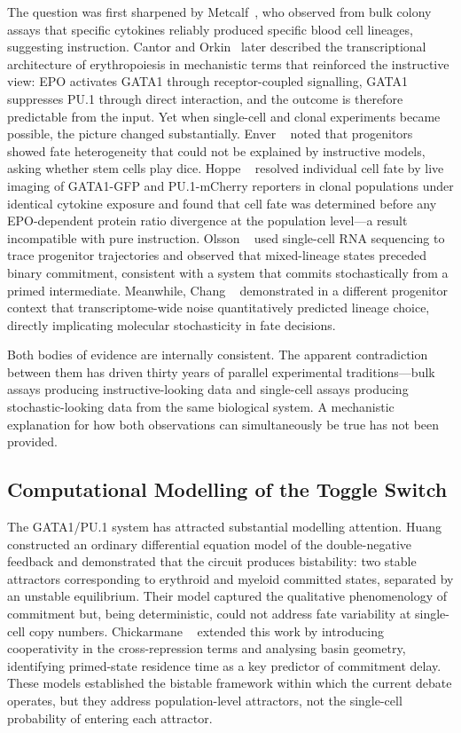 The question was first sharpened by Metcalf~\cite{metcalf1988}, who observed from bulk colony assays that specific cytokines reliably produced specific blood cell lineages, suggesting instruction. Cantor and Orkin~\cite{cantor2002} later described the transcriptional architecture of erythropoiesis in mechanistic terms that reinforced the instructive view: EPO activates GATA1 through receptor-coupled signalling, GATA1 suppresses PU.1 through direct interaction, and the outcome is therefore predictable from the input. Yet when single-cell and clonal experiments became possible, the picture changed substantially. Enver \etal~\cite{enver1998} noted that progenitors showed fate heterogeneity that could not be explained by instructive models, asking whether stem cells play dice. Hoppe \etal~\cite{hoppe2016} resolved individual cell fate by live imaging of GATA1-GFP and PU.1-mCherry reporters in clonal populations under identical cytokine exposure and found that cell fate was determined before any EPO-dependent protein ratio divergence at the population level---a result incompatible with pure instruction. Olsson \etal~\cite{olsson2016} used single-cell RNA sequencing to trace progenitor trajectories and observed that mixed-lineage states preceded binary commitment, consistent with a system that commits stochastically from a primed intermediate. Meanwhile, Chang \etal~\cite{chang2008} demonstrated in a different progenitor context that transcriptome-wide noise quantitatively predicted lineage choice, directly implicating molecular stochasticity in fate decisions.

Both bodies of evidence are internally consistent. The apparent contradiction between them has driven thirty years of parallel experimental traditions---bulk assays producing instructive-looking data and single-cell assays producing stochastic-looking data from the same biological system. A mechanistic explanation for how both observations can simultaneously be true has not been provided.

\subsection{Computational Modelling of the Toggle Switch}

The GATA1/PU.1 system has attracted substantial modelling attention. Huang \etal~\cite{huang2007} constructed an ordinary differential equation model of the double-negative feedback and demonstrated that the circuit produces bistability: two stable attractors corresponding to erythroid and myeloid committed states, separated by an unstable equilibrium. Their model captured the qualitative phenomenology of commitment but, being deterministic, could not address fate variability at single-cell copy numbers. Chickarmane \etal~\cite{chickarmane2009} extended this work by introducing cooperativity in the cross-repression terms and analysing basin geometry, identifying primed-state residence time as a key predictor of commitment delay. These models established the bistable framework within which the current debate operates, but they address population-level attractors, not the single-cell probability of entering each attractor.

